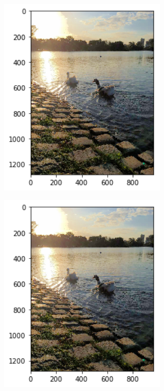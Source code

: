 \documentclass[10pt, a4paper]{article}
\begin{document}
\begin{figure}[H]
\begin{subfigure}{0.3\textwidth}
        \includegraphics[width=0.9\textwidth]{patitos-alphabetafijos-k8.png}
    \end{subfigure}\hfill	
    \centering
    \begin{subfigure}{0.3\textwidth}
        \includegraphics[width=0.9\textwidth]{patitos-alphabetafijos-k16.png}
    \end{subfigure}\hfill
\end{figure}
\end{document}
